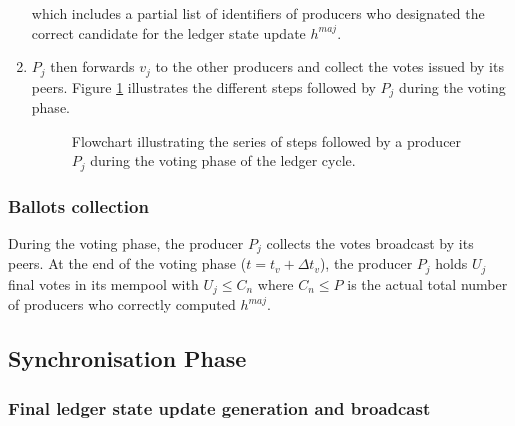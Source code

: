 \begin{enumerate}
which includes a partial list of identifiers of producers who designated the correct candidate for the ledger state update $h^{maj}$. 

\item $P_j$ then forwards $v_j$ to the other producers and collect the votes issued by its peers. Figure \ref{fig:Vot} illustrates the different steps followed by $P_j$ during the voting phase.
\begin{figure}[H]
\label{fig:Vot}
\caption{\label{fig:Vot}Flowchart illustrating the series of steps followed by a producer $P_j$ during the voting phase of the ledger cycle.}
\end{figure}
\end{enumerate}


\subsubsection{Ballots collection}
During the voting phase, the producer $P_j$ collects the votes broadcast by its peers. At the end of the voting phase ($t = t_v+\Delta t_{v}$), the producer $P_j$ holds $U_j$ final votes in its mempool with $U_j \leq C_n$ where $C_n \leq P$ is the actual total number of producers who correctly computed $h^{maj}$.


\subsection{Synchronisation Phase}
\subsubsection{Final ledger state update generation and broadcast}

